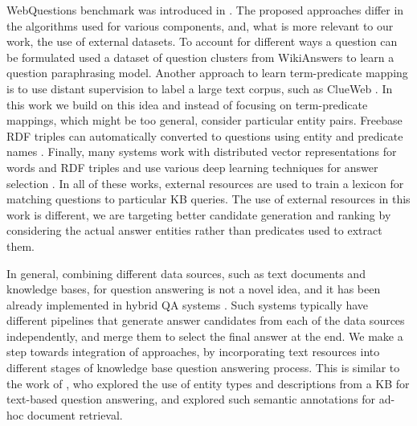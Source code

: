 WebQuestions benchmark was introduced in \cite{Berant:EMNLP13}.
The proposed approaches differ in the algorithms used for various components, and, what is more relevant to our work, the use of external datasets.
To account for different ways a question can be formulated \cite{berant2014semantic} used a dataset of question clusters from WikiAnswers to learn a question paraphrasing model.
Another approach to learn term-predicate mapping is to use distant supervision \cite{mintz2009distant} to label a large text corpus, such as ClueWeb \cite{yao2014information}.
In this work we build on this idea and instead of focusing on term-predicate mappings, which might be too general, consider particular entity pairs.
Freebase RDF triples can automatically converted to questions using entity and predicate names \cite{BordesCW14:emnlp}.
Finally, many systems work with distributed vector representations for words and RDF triples and use various deep learning techniques for answer selection \cite{BordesCW14:emnlp,yih2015semantic}.
In all of these works, external resources are used to train a lexicon for matching questions to particular KB queries.
The use of external resources in this work is different, we are targeting better candidate generation and ranking by considering the actual answer entities rather than predicates used to extract them.

In general, combining different data sources, such as text documents and knowledge bases, for question answering is not a novel idea, and it has been already implemented in hybrid QA systems \cite{baudivs2015modeling,Barker12}.
Such systems typically have different pipelines that generate answer candidates from each of the data sources independently, and merge them to select the final answer at the end.
We make a step towards integration of approaches, by incorporating text resources into different stages of knowledge base question answering process.
This is similar to the work of \cite{Sun:2015:ODQ:2736277.2741651}, who explored the use of entity types and descriptions from a KB for text-based question answering, and \cite{dalton2014entity} explored such semantic annotations for ad-hoc document retrieval.

